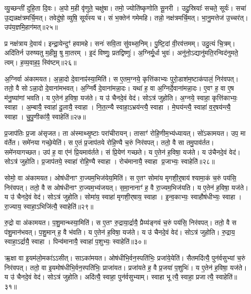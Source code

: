 व्यु॒च्छन्ती॑ दुहि॒ता दि॒वः।
अ॒पो म॒ही वृ॑णुते॒ चक्षु॑षा।
तमो॒ ज्योति॑ष्कृणोति सू॒नरी।
उदु॒स्रियाः᳚ सचते॒ सूर्यः॑।
सचा॑ उ॒द्यन्नक्ष॑त्रमर्चि॒मत्।
तवेदु॑षो॒ व्युषि॒ सूर्य॑स्य च।
सं भ॒क्तेन॑ गमेमहि।
तन्नो॒ नक्ष॑त्रमर्चि॒मत्।
भा॒नु॒मत्तेज॑ उ॒च्चर॑त्।
उप॑य॒ज्ञमि॒हाग॑मत्॥२५॥

प्र नक्ष॑त्राय दे॒वाय॑।
इन्द्रा॒येन्दुꣳ॑ हवामहे।
सनः॑ सवि॒ता सु॑वथ्स॒निम्।
पु॒ष्टि॒दां वी॒रव॑त्तमम्।
उदु॒त्यं चि॒त्रम्।
अदि॑तिर्न उरुष्यतु म॒हीमू॒ षु मा॒तरम्।
इ॒दं विष्णुः॒ प्रतद्विष्णुः॑।
अ॒ग्निर्मू॒र्धा भुवः॑।
अनु॑नो॒\-ऽद्यानु॑मति॒रन्विद॑नुमते॒ त्वम्।
ह॒व्य॒वाह॒ꣴ॒ स्वि॑ष्टम्॥२६॥\anuvakamend[आ॒य॒त्य॑गम॒थ्स्वि॑ष्टम्]

अ॒ग्निर्वा अ॑कामयत।
अ॒न्ना॒दो दे॒वानाꣴ॑स्या॒मिति॑।
स ए॒तम॒ग्नये॒ कृत्ति॑काभ्यः पुरो॒डाश॑म॒ष्टाक॑पालं॒ निर॑वपत्।
ततो॒ वै सो\-ऽन्ना॒दो दे॒वाना॑मभवत्।
अ॒ग्निर्वै दे॒वाना॑मन्ना॒दः।
यथा॑ ह॒ वा अ॒ग्निर्दे॒वाना॑मन्ना॒दः।
ए॒वꣳ ह॒ वा ए॒ष म॑नु॒ष्या॑णां भवति।
य ए॒तेन॑ ह॒विषा॒ यज॑ते।
य उ॑ चैनदे॒वं वेद॑।
सोऽत्र॑ जुहोति।
अ॒ग्नये॒ स्वाहा॒ कृत्ति॑काभ्यः॒ स्वाहा।
अ॒म्बायै॒ स्वाहा॑ दु॒लायै॒ स्वाहा।
नि॒त॒त्न्यै स्वाहा॒\-ऽभ्रय॑न्त्यै॒ स्वाहा।
मे॒घय॑न्त्यै॒ स्वाहा॑ व॒र्॒षय॑न्त्यै॒ स्वाहा।
चु॒पु॒णीका॑यै॒ स्वाहेति॑॥२७॥

प्र॒जाप॑तिः प्र॒जा अ॑सृजत।
ता अ॑स्माथ्सृ॒ष्टाः परा॑चीरायन्।
तासाꣳ॑ रोहि॒णीम॒भ्य॑ध्यायत्।
सो॑ऽकामयत।
उप॒ मा व॑र्तेत।
समे॑नया गच्छे॒येति॑।
स ए॒तं प्र॒जाप॑तये रोहि॒ण्यै च॒रुं निर॑वपत्।
ततो॒ वै सा तमु॒पाव॑र्तत।
समे॑नयागच्छत।
उप॑ ह॒ वा ए॑नं प्रि॒यमाव॑र्तते।
सं प्रि॒येण॑ गच्छते।
य ए॒तेन॑ ह॒विषा॒ यज॑ते।
य उ॑चैनदे॒वं वेद॑।
सोऽत्र॑ जुहोति।
प्र॒जाप॑तये॒ स्वाहा॑ रोहि॒ण्यै स्वाहा।
रोच॑मानायै॒ स्वाहा प्र॒जाभ्यः॒ स्वाहेति॑॥२८॥

सोमो॒ वा अ॑कामयत।
ओष॑धीनाꣳ रा॒ज्यम॒भिज॑येय॒मिति॑।
स ए॒तꣳ सोमा॑य मृगशी॒र्॒षाय॑ श्यामा॒कं च॒रुं पय॑सि॒ निर॑वपत्।
ततो॒ वै स ओष॑धीनाꣳ रा॒ज्यम॒भ्य॑जयत्।
स॒मा॒नानाꣳ॑ ह॒ वै रा॒ज्यम॒भिज॑यति।
य ए॒तेन॑ ह॒विषा॒ यज॑ते।
य उ॑ चैनदे॒वं वेद॑।
सोऽत्र॑ जुहोति।
सोमा॑य॒ स्वाहा॑ मृगशी॒र्‌\mbox{}षाय॒ स्वाहा।
इ॒न्व॒काभ्यः॒ स्वाहौष॑धीभ्यः॒ स्वाहा।
रा॒ज्याय॒ स्वाहा॒\-ऽभिजि॑त्यै॒ स्वाहेति॑॥२९॥

रु॒द्रो वा अ॑कामयत।
प॒शु॒मान्थ्स्या॒मिति॑।
स ए॒तꣳ रु॒द्राया॒र्द्रायै॒ प्रैय्य॑ङ्गवं च॒रुं पय॑सि॒ निर॑वपत्।
ततो॒ वै स प॑शु॒मान॑भवत्।
प॒शु॒मान् ह॒ वै भ॑वति।
य ए॒तेन॑ ह॒विषा॒ यज॑ते।
य उ॑ चैनदे॒वं वेद॑।
सोऽत्र॑ जुहोति।
रु॒द्राय॒ स्वाहा॒\-ऽर्द्रायै॒ स्वाहा।
पिन्व॑मानायै॒ स्वाहा॑ प॒शुभ्यः॒ स्वाहेति॑॥३०॥

ऋ॒क्षा वा इ॒यम॑लो॒मका॑\-ऽऽसीत्।
साऽका॑मयत।
ओष॑धीभि॒र्वन॒स्पति॑भिः॒ प्रजा॑ये॒येति॑।
सैतमदि॑त्यै॒ पुन॑र्वसुभ्यां च॒रुं निर॑वपत्।
ततो॒ वा इ॒यमोष॑धीभि॒र्वन॒स्पति॑भिः॒ प्राजा॑यत।
प्रजा॑यते ह॒ वै प्र॒जया॑ प॒शुभिः॑।
य ए॒तेन॑ ह॒विषा॒ यज॑ते।
य उ॑ चैनदे॒वं वेद॑।
सोऽत्र॑ जुहोति।
अदि॑त्यै॒ स्वाहा॒ पुन॑र्वसुभ्याम्।
स्वाहा भूत्यै॒ स्वाहा॒ प्रजात्यै॒ स्वाहेति॑॥३१॥

